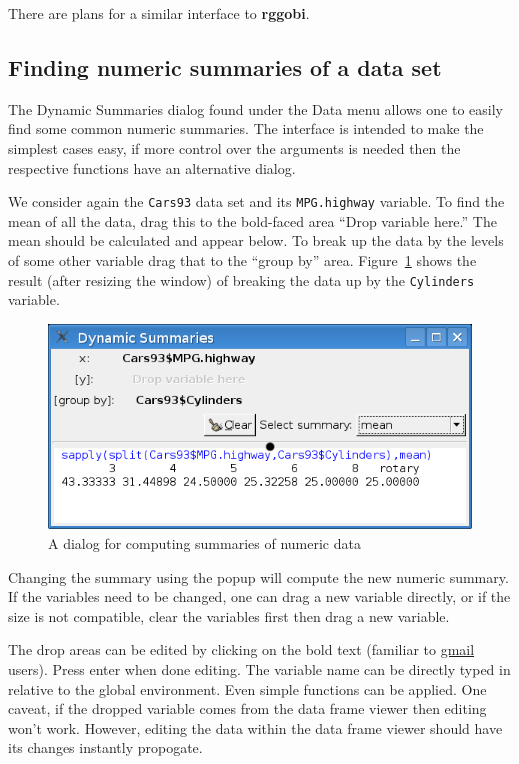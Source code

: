 \documentclass[12pt]{article}
\newcommand{\RCode}[1]{\texttt{#1}}
\newcommand{\RPackage}[1]{\textbf{#1}}
\begin{document}
There are plans for a similar interface to \RPackage{rggobi}.

\subsection{Finding numeric summaries of a data set}
\label{sec:numeric-summaries}

The Dynamic Summaries dialog found under the Data menu allows one to
easily find some common numeric summaries. The interface is intended
to make the simplest cases easy, if more control over the arguments is
needed then the respective functions have an alternative dialog.

We consider again the \RCode{Cars93} data set and its
\RCode{MPG.highway} variable. To find the mean of all the data, drag
this to the bold-faced area ``Drop variable here.'' The mean should be
calculated and appear below. To break up the data by the levels of
some other variable drag that to the ``group by''
area. Figure~\ref{fig:dynamic-summaries} shows the result (after
resizing the window) of breaking the data up by the \RCode{Cylinders}
variable.

\begin{figure}[htbp]
  \centering
  \includegraphics[width=.7\textwidth]{dynamic-summaries}
  \caption{A dialog for computing summaries of numeric data}
  \label{fig:dynamic-summaries}
\end{figure}

Changing the summary using the popup will compute the new numeric
summary. If the variables need to be changed, one can drag a new
variable directly, or if the size is not compatible, clear the
variables first then drag a new variable.

The drop areas can be edited by clicking on the bold text (familiar to
\url{gmail} users). Press enter when done editing. The variable name
can be directly typed in relative to the global environment. Even
simple functions can be applied. One caveat, if the dropped variable
comes from the data frame viewer then editing won't work. However,
editing the data within the data frame viewer should have its changes
instantly propogate.
\end{document}
